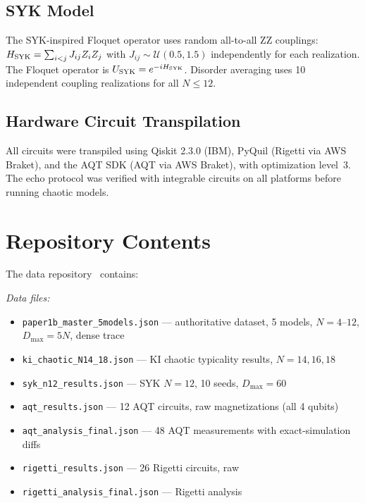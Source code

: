 \documentclass[twocolumn,showpacs,preprintnumbers,amsmath,amssymb,aps,prl]{revtex4-2}
\begin{document}
\subsection{SYK Model}

The SYK-inspired Floquet operator uses random all-to-all ZZ couplings:
$H_{\rm SYK} = \sum_{i<j} J_{ij} Z_i Z_j$ with $J_{ij} \sim \mathcal{U}(0.5,
1.5)$ independently for each realization. The Floquet operator is
$U_{\rm SYK} = e^{-iH_{\rm SYK}}$. Disorder averaging uses 10 independent
coupling realizations for all $N \leq 12$.

\subsection{Hardware Circuit Transpilation}

All circuits were transpiled using Qiskit 2.3.0 (IBM), PyQuil (Rigetti via AWS
Braket), and the AQT SDK (AQT via AWS Braket), with optimization level~3. The
echo protocol was verified with integrable circuits on all platforms before
running chaotic models.

\section{Repository Contents}

The data repository~\cite{PerezEugenio2026a} contains:

\textit{Data files:}
\begin{itemize}
  \item \texttt{paper1b\_master\_5models.json} --- authoritative dataset, 5 models,
    $N=4$--$12$, $D_{\max}=5N$, dense trace
  \item \texttt{ki\_chaotic\_N14\_18.json} --- KI chaotic typicality results,
    $N=14,16,18$
  \item \texttt{syk\_n12\_results.json} --- SYK $N=12$, 10 seeds, $D_{\max}=60$
  \item \texttt{aqt\_results.json} --- 12 AQT circuits, raw magnetizations (all
    4 qubits)
  \item \texttt{aqt\_analysis\_final.json} --- 48 AQT measurements with
    exact-simulation diffs
  \item \texttt{rigetti\_results.json} --- 26 Rigetti circuits, raw
  \item \texttt{rigetti\_analysis\_final.json} --- Rigetti analysis
\end{itemize}
\end{document}
